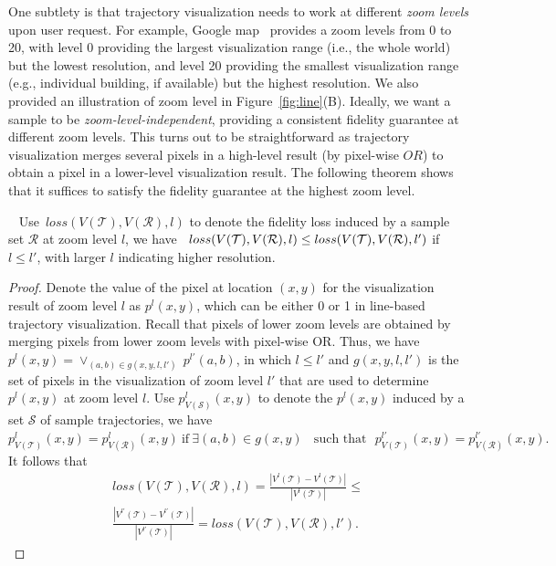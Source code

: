 One subtlety is that trajectory visualization needs to work at different \textit{zoom levels} upon user request. For example, Google map~\cite{googlemap} provides a zoom levels from 0 to 20, with level 0 providing the largest visualization range (i.e., the whole world) but the lowest resolution, and level 20 providing the smallest visualization range (e.g., individual building, if available) but the highest resolution. We also provided an illustration of zoom level in Figure~\ref{fig:line}(B). Ideally, we want a sample to be \textit{zoom-level-independent}, providing a consistent fidelity guarantee at different zoom levels. This turns out to be straightforward as trajectory visualization merges several pixels in a high-level result (by pixel-wise $OR$) to obtain a pixel in a lower-level visualization result. The following theorem shows that it suffices to satisfy the fidelity guarantee at the highest zoom level.
\begin{theorem}~\label{the:level}
	Use~$loss(V(\mathcal{T}), V(\mathcal{R}), l)$ to denote the fidelity loss induced by a sample set $\mathcal{R}$ at zoom level $l$, we have~ $loss(V(\mathcal{T}), V(\mathcal{R}), l) \\ \le loss(V(\mathcal{T}), V(\mathcal{R}), l')$ if $l\le l'$, with larger $l$ indicating higher resolution.
\end{theorem}

\begin{proof}
	Denote the value of the pixel at location $(x,y)$ for the visualization result of zoom level $l$ as $p^l(x,y)$, which can be either 0 or 1 in line-based trajectory visualization. Recall that pixels of lower zoom levels are obtained by merging pixels from lower zoom levels with pixel-wise OR. Thus, we have $p^l(x,y)=\vee_{(a,b)\in g(x,y,l,l')} \ p^{l'}(a,b)$, in which  $l\le l'$ and $g(x,y,l,l')$ is the set of pixels in the visualization of zoom level $l'$ that are used to determine $p^l(x,y)$ at zoom level $l$. Use $p^l_{V(\mathcal{S})}(x,y)$ to denote the $p^l(x,y)$ induced by a set $\mathcal{S}$ of sample trajectories, we have
	$p^l_{V(\mathcal{T})}(x,y)=p^l_{V(\mathcal{R})}(x,y) \ \text{if} \ \exists (a,b)\in g(x,y) \ \text{~~such that~~} p^{l'}_{V(\mathcal{T})}(x,y)=p^{l'}_{V(\mathcal{R})}(x,y).$ It follows that
	\begin{align} \nonumber
	loss(V(\mathcal{T}),V(\mathcal{R}),l)=   \frac{|V^l(\mathcal{T})-V^l(\mathcal{T})|}{|V^l(\mathcal{T})|}\le \\  \frac{|V^{l'}(\mathcal{T})-V^{l'}(\mathcal{T})|}{|V^{l'}(\mathcal{T})|}=loss(V(\mathcal{T}), V(\mathcal{R}), l').
	\end{align}

\end{proof}

